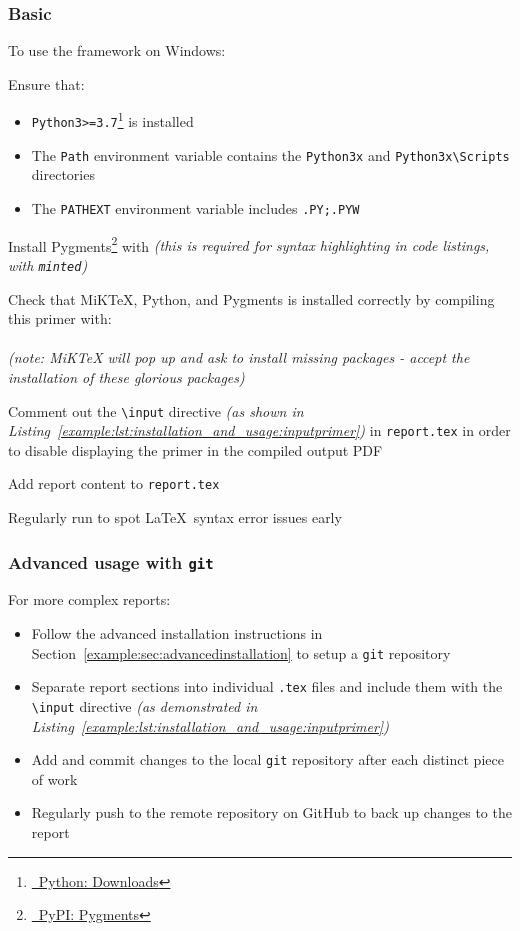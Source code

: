 \subsubsection{Basic}
To use the \uswdwmspkg{} framework on Windows:
\begin{methodology0}
  \item Ensure that:
    \begin{itemize}
      \item \texttt{Python3>=3.7}\footnote{\href{https://www.python.org/downloads/}{\faPython\ Python: Downloads}} is installed
      \item The \texttt{Path} environment variable contains the \texttt{Python3x} and \texttt{Python3x\textbackslash Scripts} directories
      \item The \texttt{PATHEXT} environment variable includes \texttt{.PY;.PYW}
    \end{itemize}
  \item Install Pygments\footnote{\href{https://pypi.org/project/Pygments/}{\faPython\ PyPI: Pygments}} with  \textit{(this is required for syntax highlighting in code listings, with \texttt{minted})}
  \item Check that MiKTeX, Python, and Pygments is installed correctly by compiling this primer with:\\
   \\
   \textit{(note: MiKTeX will pop up and ask to install missing packages - accept the installation of these glorious packages)}
  \item Comment out the \texttt{\textbackslash input} directive \textit{(as shown in Listing~\ref{example:lst:installation_and_usage:inputprimer})} in \texttt{report.tex} in order to disable displaying the primer in the compiled output PDF
  \item Add report content to \texttt{report.tex}
  \item Regularly run  to spot \LaTeX\ syntax error issues early
\end{methodology0}

\subsubsection{Advanced usage with \texttt{git}}
For more complex reports:
\begin{itemize}
  \item Follow the advanced installation instructions in Section~\ref{example:sec:advancedinstallation} to setup a \texttt{git} repository
  \item Separate report sections into individual \texttt{.tex} files and include them with the \texttt{\textbackslash input} directive \textit{(as demonstrated in Listing~\ref{example:lst:installation_and_usage:inputprimer})}
  \item Add and commit changes to the local \texttt{git} repository after each distinct piece of work
  \item Regularly push to the remote repository on GitHub to back up changes to the report
\end{itemize}

